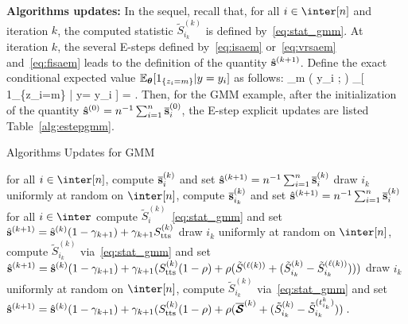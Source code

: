 \documentclass[12pt]{article}
\begin{document}
\noindent \textbf{Algorithms updates:}
In the sequel, recall that, for all $i \in \inter[n]$ and iteration $k$, the computed statistic $ \tilde{S}_{i_k}^{(k)}$ is defined by~\eqref{eq:stat_gmm}.
At iteration $k$, the several E-steps defined by~\eqref{eq:isaem} or~\eqref{eq:vrsaem} and~\eqref{eq:fisaem} leads to the definition of the quantity $\hat{{\mathbf{s}}}^{(k+1)} $. 
Define the exact conditional expected value $\mathbb{E}_{{\bm{\theta}}}[ 1_{\{z_i=m\}} | y= y_{i} ]$ as follows:
\beq \notag
\widetilde{\omega}_m ( y_{i} ; \param ) \eqdef \EE_{\param}[ 1_{\{z_i=m\}} | y= y_{i} ]
=  \eqsp.
\eeq
Then, for the GMM example, after the initialization of the quantity $\hat{{\mathbf{s}}}^{(0)} = n^{-1} \sum\nolimits_{i=1}^n \overline{{\mathbf{s}}}_i^{(0)} $, the E-step explicit updates are listed Table~\ref{alg:estepgmm}.

 \begin{protocol}[H]
\caption{Algorithms Updates for GMM}\label{alg:estepgmm}
  \begin{algorithmic}[1]
 \hspace{0.4cm} for all $i \in \inter[n]$, compute $\overline{{\mathbf{s}}}_{i}^{(k)}$ and set $\hat{{\mathbf{s}}}^{(k+1)} = n^{-1} \sum\nolimits_{i=1}^n \overline{{\mathbf{s}}}_i^{(k)}$
 \hspace{0.4cm} draw  $i_k$ uniformly at random on $\inter[n]$, compute $\overline{{\mathbf{s}}}_{i_k}^{(k)}$ and set $\hat{{\mathbf{s}}}^{(k+1)} = n^{-1} \sum\nolimits_{i=1}^n \overline{{\mathbf{s}}}_i^{(k)}$
 \hspace{0.4cm} for all $i \in \inter$ compute $ \tilde{S}_{i}^{(k)}$~\eqref{eq:stat_gmm} and set  $\hat{{\mathbf{s}}}^{(k+1)} = \hat{{\mathbf{s}}}^{(k)}(1 - \gamma_{k+1}) + \gamma_{k+1}S_{\textrm{tts}}^{(k)}$
 \hspace{0.4cm} draw  $i_k$ uniformly at random on $\inter[n]$, compute $ \tilde{S}_{i_k}^{(k)}$ via~\eqref{eq:stat_gmm} and set $\hat{{\mathbf{s}}}^{(k+1)} = \hat{{\mathbf{s}}}^{(k)}(1 - \gamma_{k+1})+ \gamma_{k+1} (S_{\textrm{tts}}^{(k)} (1 - \rho) + \rho (\tilde{S}^{(\ell(k))} +  ( \tilde{S}_{i_k}^{(k)}  -\tilde{S}_{i_k}^{(\ell(k))}   )) ) $
 \hspace{0.4cm} draw  $i_k$ uniformly at random on $\inter[n]$, compute $ \tilde{S}_{i_k}^{(k)}$ via~\eqref{eq:stat_gmm} and set $ \hat{{\mathbf{s}}}^{(k+1)} = \hat{{\mathbf{s}}}^{(k)}(1 - \gamma_{k+1})+ \gamma_{k+1} (S_{\textrm{tts}}^{(k)} (1 - \rho) + \rho (\overline{{\bm{\mathcal{S}}}}^{(k)} + ( \tilde{S}_{i_k}^{(k)}  - \tilde{S}_{i_k}^{(t_{i_k}^k)}) ) \;.$
  \end{algorithmic}
\end{protocol}
\end{document}

